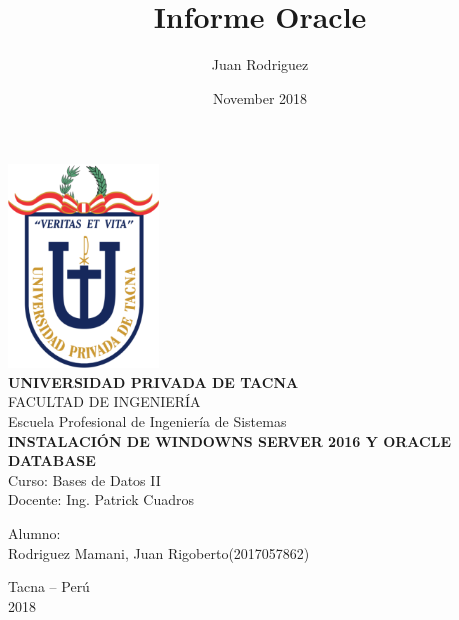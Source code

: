 \documentclass[12pt,letterpaper]{article}
\title{Informe Oracle}
\author{Juan Rodriguez}
\date{November 2018}
\begin{document}
    
    \begin{center}
        \includegraphics[width=4cm]{Imagenes/upt-logo.png}\\
        \vspace{12pt}
        \vspace{12pt}
        \large\textbf{UNIVERSIDAD PRIVADA DE TACNA}\\
        \vspace{12pt}
        \vspace{12pt}
        \large{FACULTAD DE INGENIERÍA}\\
        \vspace{12pt}
        \vspace{12pt}
        \large{Escuela Profesional de Ingeniería de Sistemas}\\
        \vspace{12pt}
        \vspace{12pt}
        \textbf{INSTALACIÓN DE WINDOWNS SERVER 2016 Y ORACLE DATABASE}\\
        \vspace{12pt}
        \vspace{12pt}
        Curso: Bases de Datos II\\
        \vspace{12pt}
        Docente: Ing. Patrick Cuadros\\
        \vspace*{12pt}
           \begin{flushleft}
        Alumno:\\
        \vspace{12pt}
        Rodriguez Mamani, Juan Rigoberto\hfill (2017057862)\\

        \end{flushleft}
        \vspace{100pt}

        Tacna – Perú\\
            2018
        \vspace{12pt}

            \thispagestyle{empty} %
            \newpage
    		\tableofcontents %
    		\thispagestyle{empty} %
            \setcounter{page}{1} %
    \end{center}
    \break
    
    






    
\end{document}
